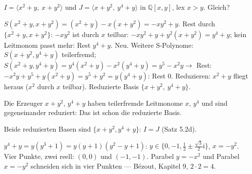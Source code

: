 \begin{aufgabe}
$I = \langle x^{2} + y,\ x + y^{2}\rangle$ und $J = \langle x + y^{2},\ y^{4} + y\rangle$ in $\mathbb Q[x, y]$, lex $x > y$. Gleich?

\loesung
{}
$S(x^{2} + y, x + y^{2}) = (x^{2} + y) - x(x + y^{2}) = -xy^{2} + y$. Rest durch $\{x^{2} + y, x + y^{2}\}$: $-xy^{2}$ ist durch $x$ teilbar: $-xy^{2} + y + y^{2}(x + y^{2}) = y^{4} + y$; kein Leitmonom passt mehr: Rest $y^{4} + y$. Neu. Weitere S-Polynome: $S(x + y^{2}, y^{4} + y)$ teilerfremd; $S(x^{2} + y, y^{4} + y) = y^{4}(x^{2} + y) - x^{2}(y^{4} + y) = y^{5} - x^{2}y\to$ Rest: $-x^{2}y + y^{5} + y(x^{2} + y) = y^{5} + y^{2} = y(y^{4} + y)$: Rest $0$. Reduzieren: $x^{2} + y$ fliegt heraus ($x^{2}$ durch $x$ teilbar). Reduzierte Basis $\{x + y^{2},\ y^{4} + y\}$.

Die Erzeuger $x + y^{2}$, $y^{4} + y$ haben teilerfremde Leitmonome $x$, $y^{4}$ und sind gegeneinander reduziert: Das ist schon die reduzierte Basis.

Beide reduzierten Basen sind $\{x + y^{2}, y^{4} + y\}$: $I = J$ (Satz 5.2d). \checkmark

$y^{4} + y = y(y^{3} + 1) = y(y + 1)(y^{2} - y + 1)$: $y\in\{0, -1, \tfrac12\pm\tfrac{\sqrt3}{2}\mathrm i\}$, $x = -y^{2}$. Vier Punkte, zwei reell: $(0,0)$ und $(-1,-1)$. Parabel $y = -x^{2}$ und Parabel $x = -y^{2}$ schneiden sich in vier Punkten --- Bézout, Kapitel 9, $2\cdot2 = 4$. \checkmark

\begin{center}
\begin{minipage}{0.88\textwidth}
\end{minipage}
\end{center}
\end{aufgabe}

